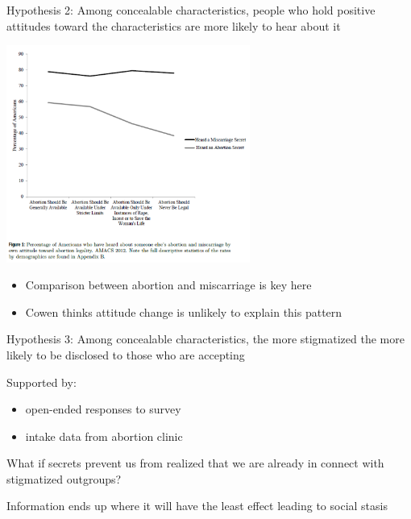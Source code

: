 \documentclass[aspectratio=169]{beamer}
\begin{document}
\begin{frame}

Hypothesis 2: Among concealable characteristics, people who hold positive attitudes toward the characteristics are more likely to hear about it

\pause

\begin{center}
\includegraphics[width=0.6\textwidth]{figures/cowan_secrets_2014_fig1}
\end{center}

\begin{itemize}
\item Comparison between abortion and miscarriage is key here
\item Cowen thinks attitude change is unlikely to explain this pattern
\end{itemize}


\end{frame}
\begin{frame}

Hypothesis 3: Among concealable characteristics, the more stigmatized the more likely to be disclosed to those who are accepting

\vfill
\pause

Supported by:
\begin{itemize}
\item open-ended responses to survey
\item intake data from abortion clinic
\end{itemize}

\end{frame}
\begin{frame}

What if secrets prevent us from realized that we are already in connect with stigmatized outgroups?\\ \pause

Information ends up where it will have the least effect leading to social stasis

\end{frame}
\end{document}
